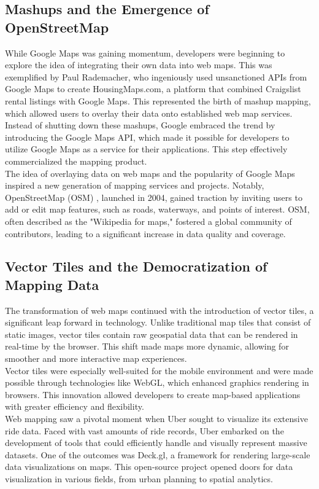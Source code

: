 \documentclass[10pt,oneside,english,a4paper]{article}
\begin{document}
\subsection{Mashups and the Emergence of OpenStreetMap} \label{history:mashups}
While Google Maps was gaining momentum, developers were beginning to explore the idea of integrating their own data into web maps. This was exemplified by Paul Rademacher, who ingeniously used unsanctioned APIs from Google Maps to create HousingMaps.com, a platform that combined Craigslist rental listings with Google Maps. This represented the birth of mashup mapping, which allowed users to overlay their data onto established web map services.
\\Instead of shutting down these mashups, Google embraced the trend by introducing the Google Maps API, which made it possible for developers to utilize Google Maps as a service for their applications. This step effectively commercialized the mapping product.
\\The idea of overlaying data on web maps and the popularity of Google Maps inspired a new generation of mapping services and projects. Notably, OpenStreetMap (OSM) , launched in 2004, gained traction by inviting users to add or edit map features, such as roads, waterways, and points of interest. OSM, often described as the "Wikipedia for maps," fostered a global community of contributors, leading to a significant increase in data quality and coverage.

\subsection{Vector Tiles and the Democratization of Mapping Data} \label{history:vector}
The transformation of web maps continued with the introduction of vector tiles, a significant leap forward in technology. Unlike traditional map tiles that consist of static images, vector tiles contain raw geospatial data that can be rendered in real-time by the browser. This shift made maps more dynamic, allowing for smoother and more interactive map experiences.
\\Vector tiles were especially well-suited for the mobile environment and were made possible through technologies like WebGL, which enhanced graphics rendering in browsers. This innovation allowed developers to create map-based applications with greater efficiency and flexibility.
\\Web mapping saw a pivotal moment when Uber sought to visualize its extensive ride data. Faced with vast amounts of ride records, Uber embarked on the development of tools that could efficiently handle and visually represent massive datasets. One of the outcomes was Deck.gl, a framework for rendering large-scale data visualizations on maps. This open-source project opened doors for data visualization in various fields, from urban planning to spatial analytics.
\end{document}
